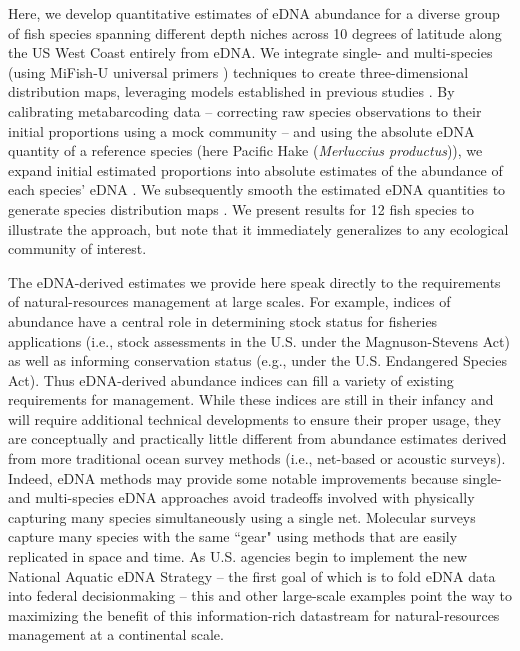 \documentclass{article}
\begin{document}
Here, we develop quantitative estimates of eDNA abundance for a diverse group of fish species spanning different depth niches across 10 degrees of latitude along the US West Coast entirely from eDNA. We integrate single- and multi-species (using MiFish-U universal primers \cite{miya2015}) techniques to create three-dimensional distribution maps, leveraging models established in previous studies \cite{shelton2022, guri2024a, shelton2023, allan2023}. By calibrating metabarcoding data -- correcting raw species observations to their initial proportions using a mock community \cite{shelton2023} -- and using the absolute eDNA quantity of a reference species (here Pacific Hake (\textit{Merluccius productus})), we expand initial estimated proportions into absolute estimates of the abundance of each species’ eDNA \cite{guri2024a}. We subsequently smooth the estimated eDNA quantities to generate species distribution maps \cite{liu2023}. We present results for 12 fish species to illustrate the approach, but note that it immediately generalizes to any ecological community of interest.

The eDNA-derived estimates we provide here speak directly to the requirements of natural-resources management at large scales. For example, indices of abundance have a central role in determining stock status for fisheries applications (i.e., stock assessments in the U.S. under the Magnuson-Stevens Act) as well as informing conservation status (e.g., under the U.S. Endangered Species Act). Thus eDNA-derived abundance indices can fill a variety of existing requirements for management. While these indices are still in their infancy and will require additional technical developments to ensure their proper usage, they are conceptually and practically little different from abundance estimates derived from more traditional ocean survey methods (i.e., net-based or acoustic surveys). Indeed, eDNA methods may provide some notable improvements because single- and multi-species eDNA approaches avoid tradeoffs involved with physically capturing many species simultaneously using a single net. Molecular surveys capture many species with the same ``gear" using methods that are easily replicated in space and time. As U.S. agencies begin to implement the new National Aquatic eDNA Strategy \cite{kelly2024} -- the first goal of which is to fold eDNA data into federal decisionmaking -- this and other large-scale examples point the way to maximizing the benefit of this information-rich datastream for natural-resources management at a continental scale.
\end{document}
